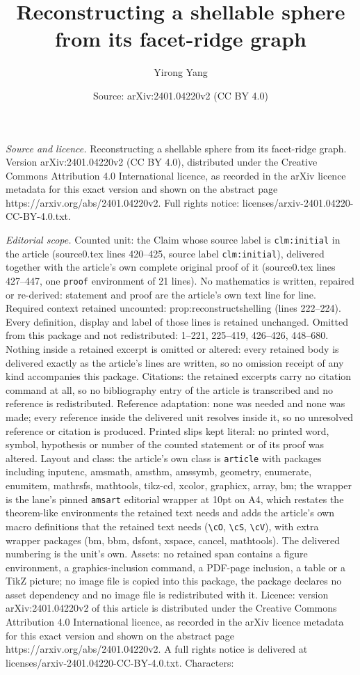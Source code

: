 \documentclass[10pt,a4paper]{amsart}
\title[Reconstructing a shellable sphere from its facet-ridge graph]{Reconstructing a shellable sphere from its facet-ridge graph}
\author{Yirong Yang}
\date{Source: arXiv:2401.04220v2 (CC BY 4.0)}
\begin{document}
\maketitle

\noindent\emph{Source and licence.} Reconstructing a shellable sphere from its facet-ridge graph. Version arXiv:2401.04220v2 (CC BY 4.0), distributed under the Creative Commons Attribution 4.0 International licence, as recorded in the arXiv licence metadata for this exact version and shown on the abstract page https://arxiv.org/abs/2401.04220v2. Full rights notice: licenses/arxiv-2401.04220-CC-BY-4.0.txt.\par\smallskip

\noindent\textit{Editorial scope.} Counted unit: the Claim whose source label is \texttt{clm:initial} in the article (source0.tex lines 420--425, source label \texttt{clm:initial}), delivered together with the article's own complete original proof of it (source0.tex lines 427--447, one \texttt{proof} environment of 21 lines). No mathematics is written, repaired or re-derived: statement and proof are the article's own text line for line. Required context retained uncounted: prop:reconstructshelling (lines 222--224). Every definition, display and label of those lines is retained unchanged. Omitted from this package and not redistributed: 1--221, 225--419, 426--426, 448--680. Nothing inside a retained excerpt is omitted or altered: every retained body is delivered exactly as the article's lines are written, so no omission receipt of any kind accompanies this package. Citations: the retained excerpts carry no citation command at all, so no bibliography entry of the article is transcribed and no reference is redistributed. Reference adaptation: none was needed and none was made; every reference inside the delivered unit resolves inside it, so no unresolved reference or citation is produced. Printed slips kept literal: no printed word, symbol, hypothesis or number of the counted statement or of its proof was altered. Layout and class: the article's own class is \texttt{article} with packages including inputenc, amsmath, amsthm, amssymb, geometry, enumerate, enumitem, mathrsfs, mathtools, tikz-cd, xcolor, graphicx, array, bm; the wrapper is the lane's pinned \texttt{amsart} editorial wrapper at 10pt on A4, which restates the theorem-like environments the retained text needs and adds the article's own macro definitions that the retained text needs (\texttt{\textbackslash cO}, \texttt{\textbackslash cS}, \texttt{\textbackslash cV}), with extra wrapper packages (bm, bbm, dsfont, xspace, cancel, mathtools). The delivered numbering is the unit's own. Assets: no retained span contains a figure environment, a graphics-inclusion command, a PDF-page inclusion, a table or a TikZ picture; no image file is copied into this package, the package declares no asset dependency and no image file is redistributed with it. Licence: version arXiv:2401.04220v2 of this article is distributed under the Creative Commons Attribution 4.0 International licence, as recorded in the arXiv licence metadata for this exact version and shown on the abstract page https://arxiv.org/abs/2401.04220v2. A full rights notice is delivered at licenses/arxiv-2401.04220-CC-BY-4.0.txt. Characters: 
\end{document}
